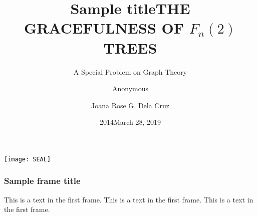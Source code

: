 \documentclass{beamer}
\title{Sample title}
\author{Anonymous}
\institute{Overleaf}
\date{2014}
\begin{document}
 
\title[About Beamer] %
{THE GRACEFULNESS OF $F_{n}\left ( 2 \right )$ TREES}
 
\subtitle{A Special Problem on Graph Theory}
 
\author[Dela Cruz] %
{Joana Rose G. Dela Cruz}
 
 
\date[VLC 2013] %
{March 28, 2019}
 
{\texttt{[image: SEAL]}}
 
 
\frame{\titlepage}
 
\begin{frame}
\frametitle{Sample frame title}
This is a text in the first frame. This is a text in the first frame. This is a text in the first frame.
\end{frame}
 
\end{document}
